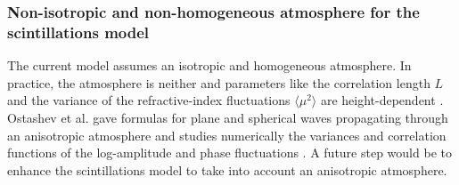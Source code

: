 \subsubsection*{Non-isotropic and non-homogeneous atmosphere for the scintillations model}
The current model assumes an isotropic and homogeneous atmosphere. In practice,
the atmosphere is neither and parameters like the correlation length $L$ and the
variance of the refractive-index fluctuations $\langle \mu^2 \rangle$ are
height-dependent \cite{Krasnenko2013}. Ostashev et al. gave formulas for plane
\cite{Ostashev1997b} and spherical \cite{Ostashev1997c} waves propagating
through an anisotropic atmosphere and studies numerically the variances and
correlation functions of the log-amplitude and phase fluctuations
\cite{Ostashev2004}. A future step would be to enhance the scintillations model
to take into account an anisotropic atmosphere.







